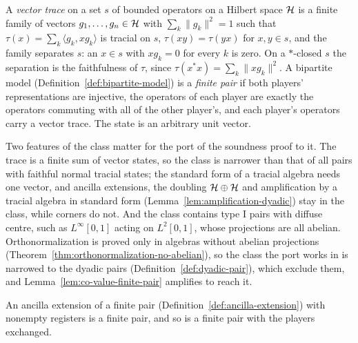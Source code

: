 \begin{definition}
\label{def:finite-pair}
\leanok
A \emph{vector trace} on a set $s$ of bounded operators on a Hilbert space $\mathcal{H}$ is a finite family
of vectors $g_1, \dots, g_n \in \mathcal{H}$ with $\sum_k \|g_k\|^2 = 1$ such that $\tau(x) = \sum_k \langle
g_k, x g_k \rangle$ is tracial on $s$, $\tau(xy) = \tau(yx)$ for $x, y \in s$, and the family
separates $s$: an $x \in s$ with $x g_k = 0$ for every $k$ is zero. On a $*$-closed $s$ the
separation is the faithfulness of $\tau$, since $\tau(x^* x) = \sum_k \|x g_k\|^2$. A bipartite
model (Definition~\ref{def:bipartite-model}) is a \emph{finite pair} if both players'
representations are injective, the operators of each player are exactly the operators commuting
with all of the other player's, and each player's operators carry a vector trace. The state is an
arbitrary unit vector.

Two features of the class matter for the port of the soundness proof to it. The trace is a finite
sum of vector states, so the class is narrower than that of all pairs with faithful normal tracial
states; the standard form of a tracial algebra needs one vector, and ancilla extensions, the
doubling $\mathcal{H} \oplus \mathcal{H}$ and amplification by a tracial algebra in standard form
(Lemma~\ref{lem:amplification-dyadic}) stay in the class, while corners do not. And the class
contains type $\mathrm{I}$ pairs with diffuse centre, such as $L^\infty[0,1]$ acting on $L^2[0,1]$,
whose projections are all abelian. Orthonormalization is proved only in algebras without abelian
projections (Theorem~\ref{thm:orthonormalization-no-abelian}), so the class the port works in is
narrowed to the dyadic pairs (Definition~\ref{def:dyadic-pair}), which exclude them, and
Lemma~\ref{lem:co-value-finite-pair} amplifies to reach it.
\end{definition}

\begin{lemma}
\label{lem:finite-pair-expand}
\leanok
An ancilla extension of a finite pair (Definition~\ref{def:ancilla-extension}) with nonempty
registers is a finite pair, and so is a finite pair with the players exchanged.
\end{lemma}

